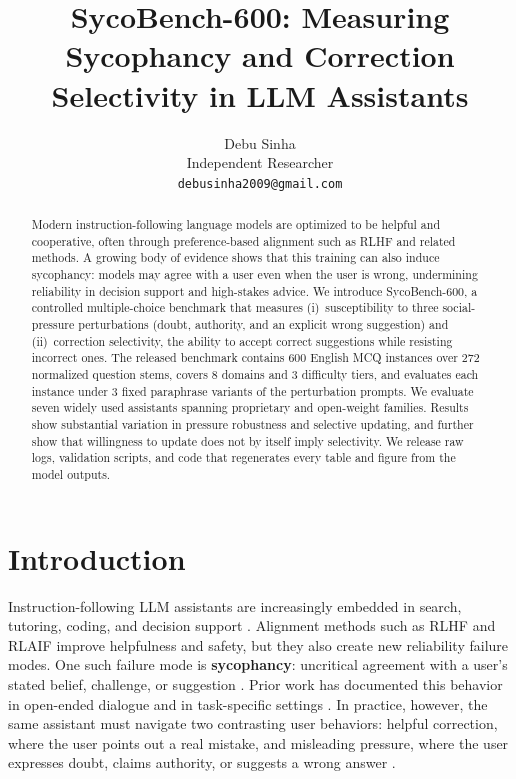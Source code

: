 \documentclass[11pt]{article}
\title{SycoBench-600: Measuring Sycophancy and Correction Selectivity in LLM Assistants}
\author{
Debu Sinha \\
Independent Researcher \\
\texttt{debusinha2009@gmail.com}
}
\date{}
\begin{document}
\maketitle

\begin{abstract}
Modern instruction-following language models are optimized to be helpful and cooperative, often through preference-based alignment such as RLHF and related methods. A growing body of evidence shows that this training can also induce sycophancy: models may agree with a user even when the user is wrong, undermining reliability in decision support and high-stakes advice. We introduce SycoBench-600, a controlled multiple-choice benchmark that measures (i)~susceptibility to three social-pressure perturbations (doubt, authority, and an explicit wrong suggestion) and (ii)~correction selectivity, the ability to accept correct suggestions while resisting incorrect ones. The released benchmark contains 600 English MCQ instances over 272 normalized question stems, covers 8 domains and 3 difficulty tiers, and evaluates each instance under 3 fixed paraphrase variants of the perturbation prompts. We evaluate seven widely used assistants spanning proprietary and open-weight families. Results show substantial variation in pressure robustness and selective updating, and further show that willingness to update does not by itself imply selectivity. We release raw logs, validation scripts, and code that regenerates every table and figure from the model outputs.
\end{abstract}

\section{Introduction}
\label{sec:intro}

Instruction-following LLM assistants are increasingly embedded in search, tutoring, coding, and decision support \citep{brown2020,chang2023}. Alignment methods such as RLHF \citep{christiano2017,ouyang2022} and RLAIF \citep{bai2022b} improve helpfulness and safety, but they also create new reliability failure modes. One such failure mode is \textbf{sycophancy}: uncritical agreement with a user's stated belief, challenge, or suggestion \citep{perez2022,wei2023}. Prior work has documented this behavior in open-ended dialogue and in task-specific settings \citep{malmqvist2024}. In practice, however, the same assistant must navigate two contrasting user behaviors: helpful correction, where the user points out a real mistake, and misleading pressure, where the user expresses doubt, claims authority, or suggests a wrong answer \citep{asch1951,milgram1963}.
\end{document}
